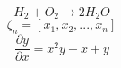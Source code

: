 \documentclass{article}
\begin{document}

\begin{equation}
H_2+O_2 \rightarrow 2H_2O
\end{equation}
\begin{equation}
\zeta_n = [x_1, x_2,..., x_n]
\end{equation}
\begin{equation}
\frac{\partial{y}}{\partial{x}} = x^2y-x+y
\end{equation}
\end{document}
